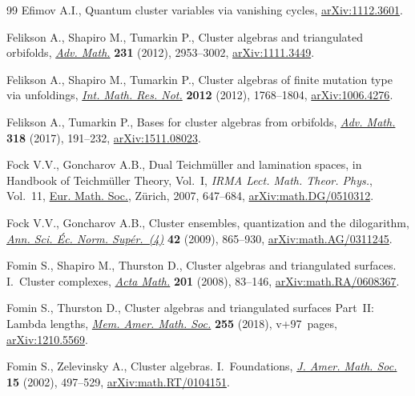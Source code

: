 \documentclass[pdftex]{sigma}%
\numberwithin{equation}{section}
\begin{document}
\begin{thebibliography}{99}
Efimov A.I., Quantum cluster variables via vanishing cycles,
 \href{https://arxiv.org/abs/1112.3601}{arXiv:1112.3601}.

Felikson A., Shapiro M., Tumarkin P., Cluster algebras and triangulated
 orbifolds, \href{https://doi.org/10.1016/j.aim.2012.07.032}{\textit{Adv. Math.}} \textbf{231} (2012), 2953--3002,
 \href{https://arxiv.org/abs/1111.3449}{arXiv:1111.3449}.

Felikson A., Shapiro M., Tumarkin P., Cluster algebras of finite mutation type
 via unfoldings, \href{https://doi.org/10.1093/imrn/rnr072}{\textit{Int. Math. Res. Not.}} \textbf{2012} (2012),
 1768--1804, \href{https://arxiv.org/abs/1006.4276}{arXiv:1006.4276}.

Felikson A., Tumarkin P., Bases for cluster algebras from orbifolds,
 \href{https://doi.org/10.1016/j.aim.2017.07.025}{\textit{Adv. Math.}} \textbf{318} (2017), 191--232, \href{https://arxiv.org/abs/1511.08023}{arXiv:1511.08023}.

Fock V.V., Goncharov A.B., Dual {T}eichm\"uller and lamination spaces, in
 Handbook of {T}eichm\"uller Theory, {V}ol.~{I}, \textit{IRMA Lect. Math.
 Theor. Phys.}, Vol.~11, \href{https://doi.org/10.4171/029-1/16}{Eur. Math. Soc.}, Z\"urich, 2007, 647--684,
 \href{https://arxiv.org/abs/math.DG/0510312}{arXiv:math.DG/0510312}.

Fock V.V., Goncharov A.B., Cluster ensembles, quantization and the dilogarithm,
 \href{https://doi.org/10.24033/asens.2112}{\textit{Ann. Sci. \'Ec. Norm. Sup\'er.~(4)}} \textbf{42} (2009), 865--930,
 \href{https://arxiv.org/abs/math.AG/0311245}{arXiv:math.AG/0311245}.

Fomin S., Shapiro M., Thurston D., Cluster algebras and triangulated surfaces.
 {I}.~{C}luster complexes, \href{https://doi.org/10.1007/s11511-008-0030-7}{\textit{Acta Math.}} \textbf{201} (2008), 83--146,
 \href{https://arxiv.org/abs/math.RA/0608367}{arXiv:math.RA/0608367}.

Fomin S., Thurston D., Cluster algebras and triangulated surfaces {P}art~{II}:
 {L}ambda lengths, \href{https://doi.org/10.1090/memo/1223}{\textit{Mem. Amer. Math. Soc.}} \textbf{255} (2018),
 v+97~pages, \href{https://arxiv.org/abs/1210.5569}{arXiv:1210.5569}.

Fomin S., Zelevinsky A., Cluster algebras. {I}.~{F}oundations, \href{https://doi.org/10.1090/S0894-0347-01-00385-X}{\textit{J. Amer.
 Math. Soc.}} \textbf{15} (2002), 497--529, \href{https://arxiv.org/abs/math.RT/0104151}{arXiv:math.RT/0104151}.


\end{thebibliography}
\end{document}
